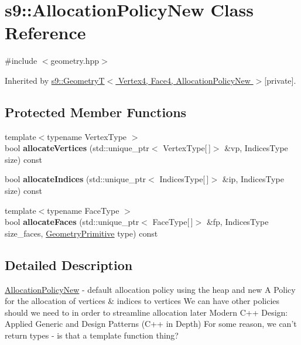 \hypertarget{classs9_1_1AllocationPolicyNew}{\section{s9\-:\-:\-Allocation\-Policy\-New \-Class \-Reference}
\label{classs9_1_1AllocationPolicyNew}
}


{\ttfamily \#include $<$geometry.\-hpp$>$}



\-Inherited by \hyperlink{classs9_1_1GeometryT}{s9\-::\-Geometry\-T$<$ Vertex4, Face4, Allocation\-Policy\-New $>$}{\ttfamily  \mbox{[}private\mbox{]}}.

\subsection*{\-Protected \-Member \-Functions}
\begin{DoxyCompactItemize}
\item 
\hypertarget{classs9_1_1AllocationPolicyNew_aaaa439b82aff0401c8e8e9e5e59b4a53}{{\footnotesize template$<$typename Vertex\-Type $>$ }\\bool {\bfseries allocate\-Vertices} (std\-::unique\-\_\-ptr$<$ \-Vertex\-Type\mbox{[}$\,$\mbox{]}$>$ \&vp, \-Indices\-Type size) const }\label{classs9_1_1AllocationPolicyNew_aaaa439b82aff0401c8e8e9e5e59b4a53}

\item 
\hypertarget{classs9_1_1AllocationPolicyNew_ac4f40e98e06df1689cf24c3a7de288d0}{bool {\bfseries allocate\-Indices} (std\-::unique\-\_\-ptr$<$ \-Indices\-Type\mbox{[}$\,$\mbox{]}$>$ \&ip, \-Indices\-Type size) const }\label{classs9_1_1AllocationPolicyNew_ac4f40e98e06df1689cf24c3a7de288d0}

\item 
\hypertarget{classs9_1_1AllocationPolicyNew_a3bc2deceba78201f4c0a17567f28cb1f}{{\footnotesize template$<$typename Face\-Type $>$ }\\bool {\bfseries allocate\-Faces} (std\-::unique\-\_\-ptr$<$ \-Face\-Type\mbox{[}$\,$\mbox{]}$>$ \&fp, \-Indices\-Type size\-\_\-faces, \hyperlink{namespaces9_ad57d1332f8fd67d23f6a1d3520ab785c}{\-Geometry\-Primitive} type) const }\label{classs9_1_1AllocationPolicyNew_a3bc2deceba78201f4c0a17567f28cb1f}

\end{DoxyCompactItemize}


\subsection{\-Detailed \-Description}
\hyperlink{classs9_1_1AllocationPolicyNew}{\-Allocation\-Policy\-New} -\/ default allocation policy using the heap and new \-A \-Policy for the allocation of vertices \& indices to vertices \-We can have other policies should we need to in order to streamline allocation later \-Modern \-C++ \-Design\-: \-Applied \-Generic and \-Design \-Patterns (\-C++ in \-Depth) \-For some reason, we can't return types -\/ is that a template function thing?

